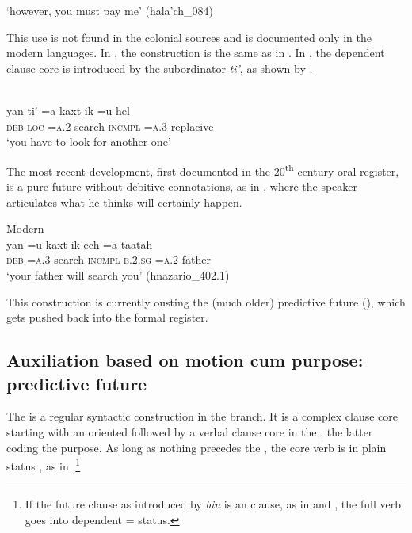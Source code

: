 \documentclass[output=paper]{langsci/langscibook}
\begin{document}
\glt `however, you must pay me' (hala'ch\_084)
\z

This use is not found in the colonial sources and is documented only in the modern  languages. In , the construction is the same as in  \citep[25]{Hofling1991}. In , the dependent clause core is introduced by the subordinator \textit{ti’}, as shown by .

\ea\label{ex:lehmann:61}
 \\
\gll       yan    ti'    =a    kaxt-ik      =u    hel\\
  \textsc{deb }    \textsc{loc}  \textsc{=a.2}    search-\textsc{incmpl } \textsc{=a.3}    replacive\\
\glt ‘you have to look for another one’ \citep[81]{Bruce1968}
\z


The most recent development, first documented in the 20\textsuperscript{th} century oral register, is a pure future without debitive connotations, as in , where the speaker articulates what he thinks will certainly happen.


\ea\label{ex:lehmann:62}
Modern  \\
\gll       yan  =u    kaxt-ik-ech          =a    taatah\\
  \textsc{deb}   \textsc{=a.3}    search-\textsc{incmpl-b.2.sg } \textsc{=a.2}    father\\
\glt `your father will search you' (hnazario\_402.1)
\z

This construction is currently ousting the (much older) predictive future (), which gets pushed back into the formal register.

\subsection{Auxiliation based on motion cum purpose: predictive future}\label{sec:lehmann:4.8}

The  is a regular syntactic construction in the  branch. It is a complex clause core starting with an oriented  followed by a verbal clause core in the , the latter coding the purpose. As long as nothing precedes the , the core verb is in plain status , as in .\footnote{If the future clause as introduced by \textit{bin} is an  clause, as in  and , the full verb goes into dependent =  status.}
\end{document}
